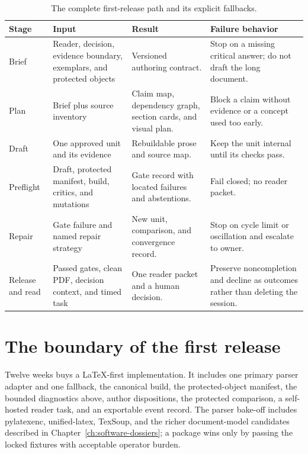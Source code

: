 \begin{table}[H]
\centering
\small
\begin{tabularx}{\textwidth}{@{}p{}p{}L p{0.22\textwidth}@{}}
\toprule
Stage & Input & Result & Failure behavior \\
\midrule
Brief & Reader, decision, evidence boundary, exemplars, and protected objects &
Versioned authoring contract. & Stop on a missing critical answer; do not draft
the long document. \\
Plan & Brief plus source inventory & Claim map, dependency graph, section cards,
and visual plan. & Block a claim without evidence or a concept used too early. \\
Draft & One approved unit and its evidence & Rebuildable prose and source map. &
Keep the unit internal until its checks pass. \\
Preflight & Draft, protected manifest, build, critics, and mutations & Gate record
with located failures and abstentions. & Fail closed; no reader packet. \\
Repair & Gate failure and named repair strategy & New unit, comparison, and
convergence record. & Stop on cycle limit or oscillation and escalate to owner. \\
Release and read & Passed gates, clean PDF, decision context, and timed task &
One reader packet and a human decision. & Preserve noncompletion and decline as
outcomes rather than deleting the session. \\
\bottomrule
\end{tabularx}
\caption{The complete first-release path and its explicit fallbacks.}
\label{tab:mvp-vertical-slice}
\end{table}

\section{The boundary of the first release}

Twelve weeks buys a LaTeX-first implementation. It includes one primary parser
adapter and one fallback, the canonical build, the protected-object manifest,
the bounded diagnostics above, author dispositions, the protected comparison,
a self-hosted reader task, and an exportable event record. The parser bake-off
includes pylatexenc, unified-latex, TexSoup, and the richer document-model
candidates described in Chapter~\ref{ch:software-dossiers}; a package wins only
by passing the locked fixtures with acceptable operator burden.

